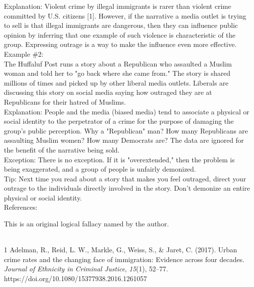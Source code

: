 \documentclass[a4paper,12pt,single,pdftex]{scrbook}
\begin{document}
    
      Explanation: Violent crime by illegal immigrants is rarer than violent crime committed by U.S. citizens [1]. However, if the narrative a media outlet is trying to sell is that illegal immigrants are dangerous, then they can influence public opinion by inferring that one example of such violence is characteristic of the group. Expressing outrage is a way to make the influence even more effective.
    \\

    
      Example \#2:
    \\

    
      The Huffaluf Post runs a story about a Republican who assaulted a Muslim woman and told her to "go back where she came from." The story is shared millions of times and picked up by other liberal media outlets. Liberals are discussing this story on social media saying how outraged they are at Republicans for their hatred of Muslims.
    \\

    
      Explanation: People and the media (biased media) tend to associate a physical or social identity to the perpetrator of a crime for the purpose of damaging the group's public perception. Why a "Republican" man? How many Republicans are assaulting Muslim women? How many Democrats are? The data are ignored for the benefit of the narrative being sold.
    \\

    
      Exception: There is no exception. If it is "overextended," then the problem is being exaggerated, and a group of people is unfairly demonized.
    \\

    
      Tip: Next time you read about a story that makes you feel outraged, direct your outrage to the individuals directly involved in the story. Don't demonize an entire physical or social identity.
    \\

    References:

    
      This is an original logical fallacy named by the author.

      
        
      \\

      
        1 Adelman, R., Reid, L. W., Markle, G., Weiss, S., \& Jaret, C. (2017). Urban crime rates and the changing face of immigration: Evidence across four decades. {\it Journal of Ethnicity in Criminal Justice}, {\it 15}(1), 52–77. https://doi.org/10.1080/15377938.2016.1261057
      \\
\end{document}
